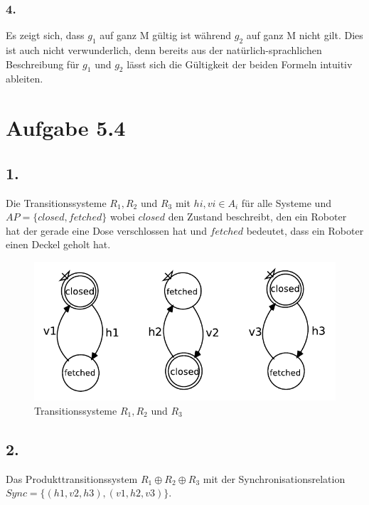 \documentclass[12pt, paper=a4]{article}
\begin{document}
\subsubsection*{4.}
Es zeigt sich, dass $g_{1}$ auf ganz M gültig ist während $g_{2}$ auf ganz M nicht gilt.
Dies ist auch nicht verwunderlich, denn bereits aus der natürlich-sprachlichen Beschreibung für $g_{1}$ und $g_{2}$ lässt sich die Gültigkeit der beiden Formeln intuitiv ableiten.

\newpage
\section*{Aufgabe 5.4}
\subsection*{1.}
Die Transitionssysteme $R_1, R_2$ und $R_3$ mit $hi, vi \in A_i$ für alle Systeme und $AP = \{closed, fetched\}$ wobei $closed$ den Zustand beschreibt, den ein Roboter hat der gerade eine Dose verschlossen hat und $fetched$ bedeutet, dass ein Roboter einen Deckel geholt hat.\\

\begin{figure}[h!]
\centering
\includegraphics[scale=0.8]{r1r2r3.pdf}
\caption{Transitionssysteme $R_1, R_2$ und $R_3$}
\end{figure}

\subsection*{2.}
Das Produkttransitionssystem $R_1 \oplus R_2 \oplus R_3$ mit der Synchronisationsrelation $Sync = \{(h1, v2, h3), (v1, h2, v3)\}$.\\
\end{document}
